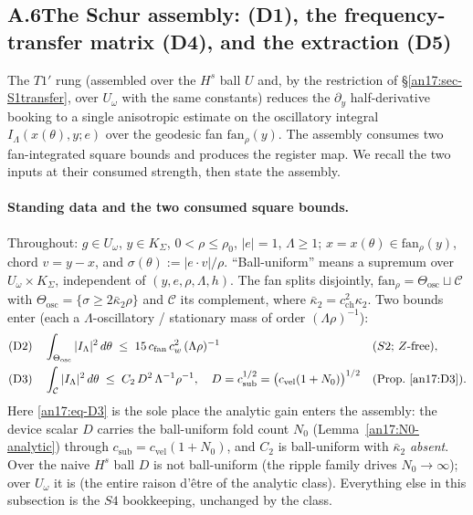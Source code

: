 \subsection{A.6\quad The Schur assembly: (D1), the frequency-transfer matrix
(D4), and the extraction (D5)}
\label{an17:sec-schur}

The $T1'$ rung (assembled over the $H^s$ ball $U$ and, by the restriction of
\S\ref{an17:sec-S1transfer}, over $U_\omega$ with the same constants) reduces the
$\partial_y$ half-derivative booking to a single anisotropic estimate on the
oscillatory integral $I_\Lambda(x(\theta),y;e)$ over the geodesic fan
$\mathrm{fan}_\rho(y)$. The assembly consumes two fan-integrated square
bounds and produces the register map. We recall the two inputs at their consumed
strength, then state the assembly.

\paragraph{Standing data and the two consumed square bounds.} Throughout:
$g\in U_\omega$, $y\in K_\Sigma$, $0<\rho\le\rho_0$, $|e|=1$, $\Lambda\ge1$;
$x=x(\theta)\in\mathrm{fan}_\rho(y)$, chord $v=y-x$, and
$\sigma(\theta):=|e\cdot v|/\rho$. ``Ball-uniform'' means a supremum over
$U_\omega\times K_\Sigma$, independent of $(y,e,\rho,\Lambda,h)$. The fan splits
disjointly, $\mathrm{fan}_\rho=\Theta_{\mathrm{osc}}\sqcup\mathcal C$ with
$\Theta_{\mathrm{osc}}=\{\sigma\ge2\bar\kappa_2\rho\}$ and $\mathcal C$ its
complement, where $\bar\kappa_2=c_{\mathrm{ch}}^2\kappa_2$. Two bounds
enter (each a $\Lambda$-oscillatory / stationary mass of order
$(\Lambda\rho)^{-1}$):
\begin{align}
 \text{(D2)}\quad &\int_{\Theta_{\mathrm{osc}}}|I_\Lambda|^2\,d\theta
   \;\le\;15\,c_{\mathrm{fan}}\,c_w^2\,(\Lambda\rho)^{-1}
   &&(\text{$S2$; $Z$-free}),\label{an17:eq-D2}\\
 \text{(D3)}\quad &\int_{\mathcal C}|I_\Lambda|^2\,d\theta
   \;\le\;C_2\,D^2\,\Lambda^{-1}\rho^{-1},\quad
   D=c_{\mathrm{sub}}^{1/2}=\bigl(c_{\mathrm{vel}}(1+N_0)\bigr)^{1/2}
   &&(\text{Prop.~\ref{an17:D3}}).\label{an17:eq-D3}
\end{align}
Here \eqref{an17:eq-D3} is the sole place the analytic gain enters the assembly:
the device scalar $D$ carries the ball-uniform fold count $N_0$
(Lemma~\ref{an17:N0-analytic}) through $c_{\mathrm{sub}}=c_{\mathrm{vel}}(1+N_0)$,
and $C_2$ is ball-uniform with $\bar\kappa_2$ \emph{absent}. Over the naive $H^s$
ball $D$ is not ball-uniform (the ripple family drives $N_0\to\infty$); over
$U_\omega$ it is (the entire raison d'\^etre of the analytic class). Everything
else in this subsection is the $S4$ bookkeeping, unchanged by the class.

